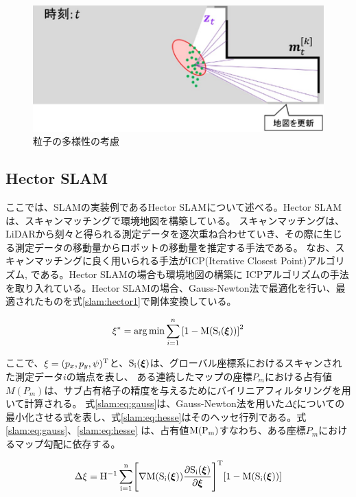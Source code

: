 \begin{figure}[h]
  \begin{center}
  \includegraphics[width=.8\linewidth]{img/slam_20.jpg}
  \caption{粒子の多様性の考慮}
  \label{slam:sample_tayou}
  \end{center}
\end{figure}

\clearpage
\subsection{Hector SLAM}
ここでは、SLAMの実装例であるHector SLAMについて述べる。Hector SLAMは、スキャンマッチングで環境地図を構築している。
スキャンマッチングは、LiDARから刻々と得られる測定データを逐次重ね合わせていき、その際に生じる測定データの移動量からロボットの移動量を推定する手法である。
なお、スキャンマッチングに良く用いられる手法がICP(Iterative Closest Point)アルゴリズム\cite{slam:masuda}, \cite{slam:icp}である。Hector SLAMの場合も環境地図の構築に
ICPアルゴリズムの手法を取り入れている。Hector SLAMの場合、Gauss-Newton法で最適化を行い、最適されたものを式\eqref{slam:hector1}で剛体変換している。

\begin{align}
  \xi^{*} = \arg\min\sum_{i = 1}^{n} \left[1-\rm{M}(\rm{\bm{S}}_i(\bm{\xi}))\right]^2 \label{slam:hector1}
\end{align}

ここで、$\xi=(p_x,p_y,\psi)^{\rm{T}}$と、$\rm{\bm{S}}_i(\bm{\xi})$は、グローバル座標系におけるスキャンされた測定データ$i$の端点を表し、
ある連続したマップの座標$P_m$における占有値$M(P_m)$は、サブ占有格子の精度を与えるためにバイリニアフィルタリングを用いて計算される。
式\ref{slam:eq:gauss}は、Gauss-Newton法を用いた$\Delta\xi$についての最小化させる式を表し、式\eqref{slam:eq:hesse}はそのヘッセ行列である。式\eqref{slam:eq:gauss}、\eqref{slam:eq:hesse}
は、占有値$\rm{M}(P_m)$すなわち、ある座標$P_m$におけるマップ勾配に依存する。

\begin{align}
  \Delta\xi = \rm{H}^{-1}\sum_{i = 1}^{n}\Biggl[\nabla M(S_i(\bm{\xi}))\frac{\partial\rm{S}_i(\bm{\xi})}{\partial\bm{\xi}}\Biggr]^{\rm{T}}[1-M(\rm{S}_i(\bm{\xi}))] \label{slam:eq:gauss}
\end{align}

